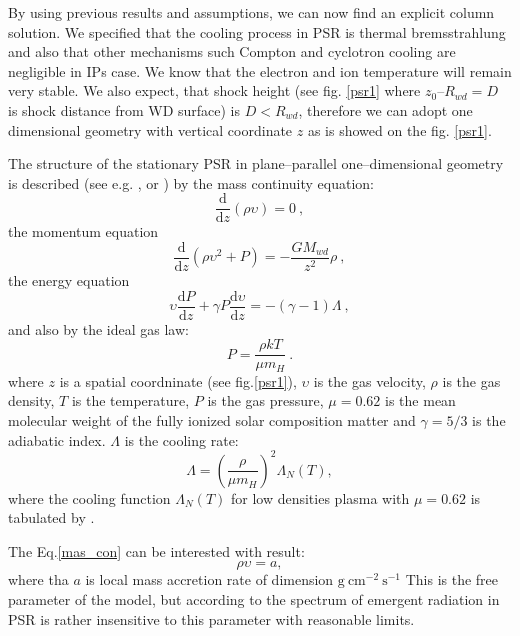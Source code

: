 \documentclass[oneside,a4paper,11pt]{report}
\begin{document}
By using previous results and assumptions, we can now find an explicit column solution. We specified 
that the cooling process in PSR is thermal bremsstrahlung and also that other mechanisms such Compton 
and cyclotron cooling are negligible in IPs case. We know that the electron and ion temperature will 
remain very stable. We also expect, that shock height (see fig. \ref{psr1} where $z_0 – R_{wd} = D$ 
is shock distance from WD surface) is $D < R_{wd}$, therefore we can adopt one dimensional geometry 
with vertical coordinate $z$ as is showed on the fig. \ref{psr1}.

The structure of the stationary PSR in plane--parallel one--dimensional geometry is described
(see e.g. \citet{2005A&A...435..191S}, \citet{1999MNRAS.306..684C} or \citet{accpower:1}) by the
mass continuity equation:
\begin{equation}
 \label{mas_con}
\frac{\mathrm{d}}{\mathrm{d}z}(\rho \upsilon) = 0   \:,
\end{equation}
the momentum equation
\begin{equation}
 \label{momentum_eq}
\frac{\mathrm{d}}{\mathrm{d}z}(\rho \upsilon^2 + P) = -\frac{GM_{wd}}{z^2}\rho             \:,
\end{equation}
the energy equation 
\begin{equation}
 \label{ener_eq}
\upsilon \frac{\mathrm{d}P}{\mathrm{d}z} + \gamma P \frac{\mathrm{d}\upsilon}{\mathrm{d}z} = -(\gamma -1)\Lambda    \:,
\end{equation}
and also by the ideal gas law:
\begin{equation}
 \label{ideal_gas_l}
P = \frac{\rho k T}{\mu m_H}   \:.
\end{equation}
where $z$ is a spatial coordninate (see fig.\ref{psr1}), $\upsilon$ is the gas velocity, $\rho$ is the gas 
density, $T$ is the temperature, $P$ is the gas pressure, $\mu=0.62$ is the mean molecular weight of the fully
ionized solar composition matter and $\gamma = 5/3$ is the adiabatic index. $\Lambda$ is the cooling rate:
\begin{equation}
 \label{cool_rate_L}
\Lambda = \left( \frac{\rho}{\mu m_H}\right)^2 \Lambda_N(T),
\end{equation}
where the cooling function $\Lambda_N(T)$ for low densities plasma with $\mu=0.62$ is 
tabulated by \citet{1993ApJS...88..253S}.

The Eq.\eqref{mas_con} can be interested with result:
\begin{equation}
 \label{res_int_mas_con}
\rho \upsilon = a,
\end{equation}
where tha $a$ is local mass accretion rate of dimension $\mathrm{g\:cm^{-2}\:s^{-1}}$
This is the free parameter of the model, but according to \citet{2005A&A...435..191S} the spectrum of 
emergent radiation in PSR is rather insensitive to this parameter with reasonable limits.     
\end{document}

